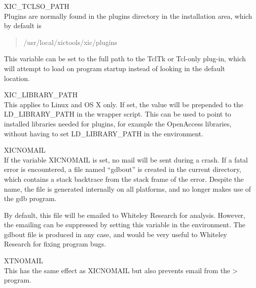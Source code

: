 \begin{description}
\item{\et XIC\_TCLSO\_PATH}\\
Plugins are normally found in the {\vt plugins} directory in the
installation area, which by default is
\begin{quote}
\vt /usr/local/xictools/xic/plugins
\end{quote}
This variable can be set to the full path to the TclTk or Tcl-only
plug-in, which {\Xic} will attempt to load on program startup instead
of looking in the default location.

\item{\et XIC\_LIBRARY\_PATH}\\
This applies to Linux and OS X only.  If set, the value will be
prepended to the {\vt LD\_LIBRARY\_PATH} in the {\Xic} wrapper script. 
This can be used to point to installed libraries needed for plugins,
for example the OpenAccess libraries,
without having to set {\vt LD\_LIBRARY\_PATH} in the environment. 

\item{\et XICNOMAIL}\\
If the variable {\et XICNOMAIL} is set, no mail will be sent during a
crash.  If a fatal error is encountered, a file named ``{\vt gdbout}''
is created in the current directory, which contains a stack backtrace
from the stack frame of the error.  Despite the name, the file is
generated internally on all platforms, and no longer makes use of the
{\vt gdb} program.
 
By default, this file will be emailed to Whiteley Research for
analysis.  However, the emailing can be suppressed by setting this
variable in the environment.  The {\vt gdbout} file is produced in any
case, and would be very useful to Whiteley Research for fixing program
bugs.

\item{\et XTNOMAIL}\\
This has the same effect as {\et XICNOMAIL} but also prevents email
from the {\WRspice}> program.


\end{description}
